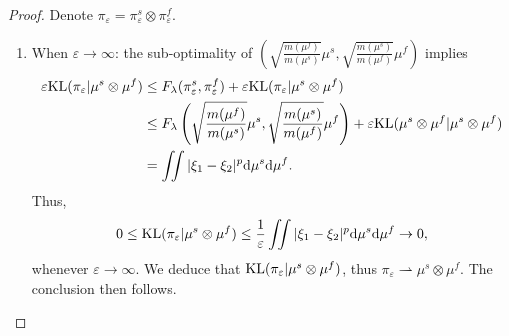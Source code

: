 \begin{proof}
  Denote $\pi_{\varepsilon} = \pi_{\varepsilon}^s \otimes \pi_{\varepsilon}^f$.
  \begin{enumerate}
    \item When $\varepsilon \to \infty$: the sub-optimality of $\left( \sqrt{\frac{m(\mu^f)}{m(\mu^s)}} \mu^s, \sqrt{\frac{m(\mu^s)}{m(\mu^f)}} \mu^f \right)$ implies
    \begin{equation}
      \begin{split}
        \varepsilon \text{KL}(\pi_{\varepsilon} \vert \mu^s \otimes \mu^f)
        &\leq F_{\lambda}(\pi_{\varepsilon}^s, \pi_{\varepsilon}^f) +
        \varepsilon \text{KL}(\pi_{\varepsilon} \vert \mu^s \otimes \mu^f) \\
        &\leq F_{\lambda} \left( \sqrt{\frac{m(\mu^f)}{m(\mu^s)}} \mu^s, \sqrt{\frac{m(\mu^s)}{m(\mu^f)}} \mu^f \right) +
        \varepsilon \text{KL}( \mu^s \otimes \mu^f \vert \mu^s \otimes \mu^f) \\
        &= \iint \vert \xi_1 - \xi_2 \vert^p \mathrm d\mu^s \mathrm d\mu^f.
      \end{split}
    \end{equation}
    Thus,
    \begin{equation}
      0 \leq \text{KL}(\pi_{\varepsilon} \vert \mu^s \otimes \mu^f)
      \leq \frac{1}{\varepsilon} \iint \vert \xi_1 - \xi_2 \vert^p
      \mathrm d\mu^s \mathrm d\mu^f \to 0,
    \end{equation}
    whenever $\varepsilon \to \infty$. We deduce that $\text{KL}(\pi_{\varepsilon} \vert \mu^s \otimes \mu^f)$,
    thus $\pi_{\varepsilon} \rightharpoonup \mu^s \otimes \mu^f$. The conclusion then follows.


\end{enumerate}
\end{proof}
